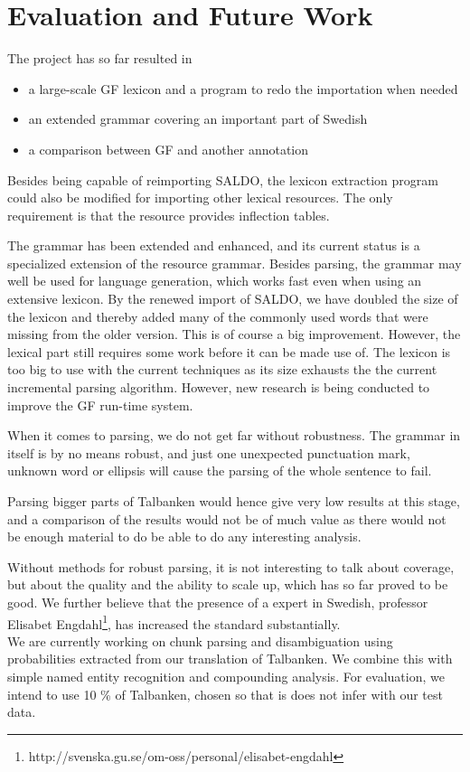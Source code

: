 \documentclass[10pt, a4paper]{article}
\begin{document}
\section{Evaluation and Future Work}
The project has so far resulted in
\begin{itemize}
\item a large-scale GF lexicon and a program to redo the importation when needed
\item an extended grammar covering an important part of Swedish
\item a comparison between GF and another annotation
\end{itemize}

Besides being capable of reimporting SALDO, the lexicon extraction program could also
be modified for importing other lexical resources. The only requirement is that
the resource provides inflection tables.

The grammar has been extended and enhanced, and its current status is
a specialized extension of the resource grammar.
Besides parsing, the grammar may well be used for language generation,
which works fast even when using an extensive lexicon.
By the renewed import of SALDO, we have doubled the size of the lexicon and thereby
added many of the commonly used words that were missing from the older
version. This is of course a big improvement.
However, the lexical part still requires some work before it can be made use of.
The lexicon is too big to use with the current techniques as its size exhausts the
the current incremental parsing algorithm. However, new research is being conducted
to improve the GF run-time system.

When it comes to parsing, we do not get far without robustness.
The grammar in itself is by no means robust, and just one 
unexpected punctuation mark, unknown word
or ellipsis will cause the parsing of the whole sentence to fail. 

Parsing bigger parts of Talbanken would hence give very low results at this stage, 
and a comparison of the results would not be of much value as
there would not be enough material
to do be able to do any interesting analysis.

Without methods for robust parsing, %
it is not interesting to talk about coverage, but about the quality and
the ability to scale up, which has so far proved to be good.
We further believe that the presence of a expert in Swedish, professor Elisabet
Engdahl\footnote{http://svenska.gu.se/om-oss/personal/elisabet-engdahl},
has increased the standard substantially.\\
We are currently working on chunk parsing and disambiguation using probabilities
extracted from our translation of Talbanken. We combine this with simple named
entity recognition and compounding analysis. For evaluation, we intend to use
10 \% of Talbanken, chosen so that is does not infer with our test data.
\end{document}
